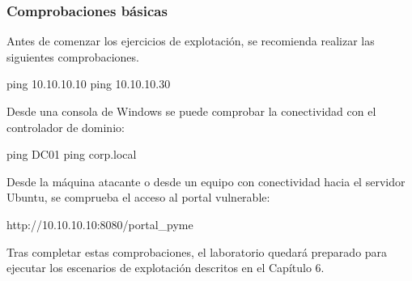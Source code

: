 \subsubsection*{Comprobaciones básicas}

Antes de comenzar los ejercicios de explotación, se recomienda realizar las siguientes comprobaciones.


\begin{bashbox}
ping 10.10.10.10
ping 10.10.10.30
\end{bashbox}


Desde una consola de Windows se puede comprobar la conectividad con el controlador de dominio:

\begin{configbox}
ping DC01
ping corp.local
\end{configbox}


Desde la máquina atacante o desde un equipo con conectividad hacia el servidor Ubuntu, se comprueba el acceso al portal vulnerable:

\begin{configbox}
http://10.10.10.10:8080/portal_pyme
\end{configbox}

Tras completar estas comprobaciones, el laboratorio quedará preparado para ejecutar los escenarios de explotación descritos en el Capítulo 6.